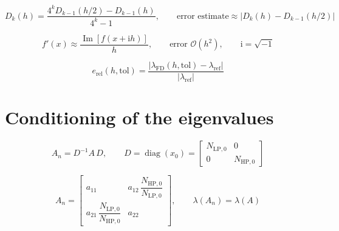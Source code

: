 \documentclass[11pt,a4paper]{article}
\begin{document}
\begin{equation}
  D_{k}(h) = \frac{4^{k} D_{k-1}(h/2) - D_{k-1}(h)}{4^{k} - 1},
  \qquad
  \text{error estimate} \approx \left| D_{k}(h) - D_{k-1}(h/2) \right|
  \label{eq:richardson-general}
\end{equation}

\begin{equation}
  f'(x) \approx \frac{\operatorname{Im}\left[f(x + \mathrm{i}h)\right]}{h},
  \qquad \text{error } \mathcal{O}(h^{2}), \qquad \mathrm{i} = \sqrt{-1}
  \label{eq:complex-step}
\end{equation}

\begin{equation}
  e_{\mathrm{rel}}(h,\mathrm{tol}) =
  \frac{\left| \lambda_{\mathrm{FD}}(h,\mathrm{tol}) - \lambda_{\mathrm{ref}} \right|}{\left| \lambda_{\mathrm{ref}} \right|}
  \label{eq:relative-error}
\end{equation}

\section{Conditioning of the eigenvalues}

\begin{equation}
  A_n = D^{-1} A\, D, \qquad
  D = \operatorname{diag}(x_0) = \begin{bmatrix} N_{\mathrm{LP},0} & 0 \\ 0 & N_{\mathrm{HP},0} \end{bmatrix}
  \label{eq:normalized}
\end{equation}

\begin{equation}
  A_n = \begin{bmatrix}
      a_{11} & a_{12}\,\dfrac{N_{\mathrm{HP},0}}{N_{\mathrm{LP},0}} \\[10pt]
      a_{21}\,\dfrac{N_{\mathrm{LP},0}}{N_{\mathrm{HP},0}} & a_{22}
    \end{bmatrix},
  \qquad \lambda(A_n) = \lambda(A)
  \label{eq:normalized-elements}
\end{equation}
\end{document}
